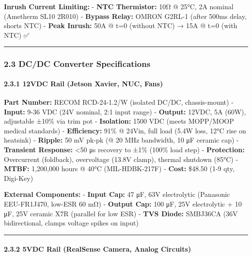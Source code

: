 \documentclass[
]{article}
\begin{document}
\textbf{Inrush Current Limiting:} - \textbf{NTC Thermistor:} 10Ω @ 25°C,
2A nominal (Ametherm SL10 2R010) - \textbf{Bypass Relay:} OMRON G2RL-1
(after 500ms delay, shorts NTC) - \textbf{Peak Inrush:} 50A @ t=0
(without NTC) → 15A @ t=0 (with NTC) ✅

\begin{center}\rule{0.5\linewidth}{0.5pt}\end{center}

\hypertarget{dcdc-converter-specifications}{%
\subsubsection{2.3 DC/DC Converter
Specifications}\label{dcdc-converter-specifications}}

\hypertarget{vdc-rail-jetson-xavier-nuc-fans}{%
\paragraph{2.3.1 12VDC Rail (Jetson Xavier, NUC,
Fans)}\label{vdc-rail-jetson-xavier-nuc-fans}}

\textbf{Part Number:} RECOM RCD-24-1.2/W (isolated DC/DC, chassis-mount)
- \textbf{Input:} 9-36 VDC (24V nominal, 2:1 input range) -
\textbf{Output:} 12VDC, 5A (60W), adjustable ±10\% via trim pot -
\textbf{Isolation:} 1500 VDC (meets MOPP/MOOP medical standards) -
\textbf{Efficiency:} 91\% @ 24Vin, full load (5.4W loss, 12°C rise on
heatsink) - \textbf{Ripple:} 50 mV pk-pk (@ 20 MHz bandwidth, 10 μF
ceramic cap) - \textbf{Transient Response:} \textless50 μs recovery to
±1\% (100\% load step) - \textbf{Protection:} Overcurrent (foldback),
overvoltage (13.8V clamp), thermal shutdown (85°C) - \textbf{MTBF:}
1,200,000 hours @ 40°C (MIL-HDBK-217F) - \textbf{Cost:} \$48.50 (1-9
qty, Digi-Key)

\textbf{External Components:} - \textbf{Input Cap:} 47 μF, 63V
electrolytic (Panasonic EEU-FR1J470, low-ESR 60 mΩ) - \textbf{Output
Cap:} 100 μF, 25V electrolytic + 10 μF, 25V ceramic X7R (parallel for
low ESR) - \textbf{TVS Diode:} SMBJ36CA (36V bidirectional, clamps
voltage spikes on input)

\begin{center}\rule{0.5\linewidth}{0.5pt}\end{center}

\hypertarget{vdc-rail-realsense-camera-analog-circuits}{%
\paragraph{2.3.2 5VDC Rail (RealSense Camera, Analog
Circuits)}\label{vdc-rail-realsense-camera-analog-circuits}}
\end{document}
